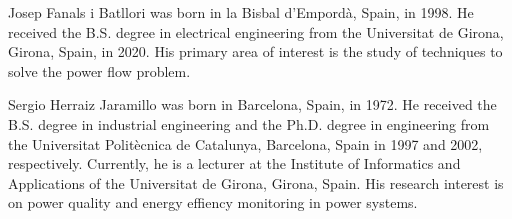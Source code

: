 \documentclass[journal]{IEEEtran}
\begin{document}
% 

\begin{IEEEbiography}{Josep Fanals i Batllori}
was born in la Bisbal d'Empordà, Spain, in 1998. He received the B.S. degree in electrical engineering from the Universitat de Girona, Girona, Spain, in 2020. His primary area of interest is the study of techniques to solve the power flow problem.
\end{IEEEbiography}

\begin{IEEEbiography}{Sergio Herraiz Jaramillo}
was born in Barcelona, Spain, in 1972. He received the B.S. degree in industrial engineering and the Ph.D. degree in engineering from the Universitat Politècnica de Catalunya, Barcelona, Spain in 1997 and 2002, respectively. Currently, he is a lecturer at the Institute of Informatics and Applications of the Universitat de Girona, Girona, Spain. His research interest is on power quality and energy effiency monitoring in power systems.
\end{IEEEbiography}

\vfill
\end{document}
